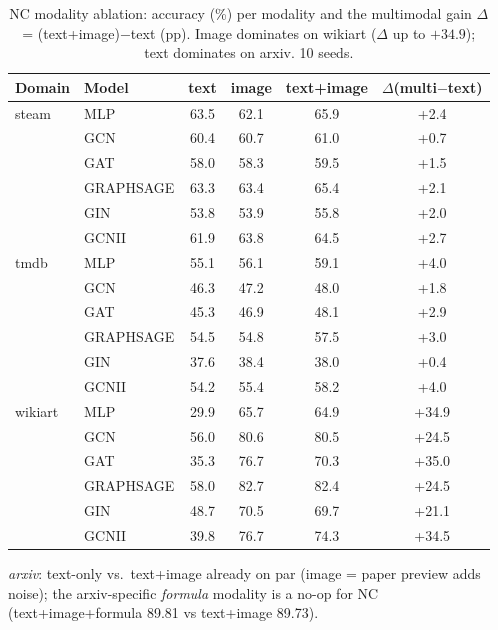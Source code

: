 \begin{table}[ht]
\centering\small\setlength{\tabcolsep}{6pt}\renewcommand{\arraystretch}{1.1}
\caption{NC modality ablation: accuracy (\%) per modality and the multimodal gain $\Delta$ = (text+image)$-$text (pp). Image dominates on wikiart ($\Delta$ up to $+34.9$); text dominates on arxiv. 10 seeds.}
\label{tab:nc_modality}
\begin{tabular}{llcccc}
\toprule
Domain & Model & text & image & text+image & $\Delta$(multi$-$text) \\
\midrule
steam    & MLP        & 63.5 & 62.1 & 65.9 & +2.4 \\
         & GCN        & 60.4 & 60.7 & 61.0 & +0.7 \\
         & GAT        & 58.0 & 58.3 & 59.5 & +1.5 \\
         & GRAPHSAGE  & 63.3 & 63.4 & 65.4 & +2.1 \\
         & GIN        & 53.8 & 53.9 & 55.8 & +2.0 \\
         & GCNII      & 61.9 & 63.8 & 64.5 & +2.7 \\
\midrule
tmdb     & MLP        & 55.1 & 56.1 & 59.1 & +4.0 \\
         & GCN        & 46.3 & 47.2 & 48.0 & +1.8 \\
         & GAT        & 45.3 & 46.9 & 48.1 & +2.9 \\
         & GRAPHSAGE  & 54.5 & 54.8 & 57.5 & +3.0 \\
         & GIN        & 37.6 & 38.4 & 38.0 & +0.4 \\
         & GCNII      & 54.2 & 55.4 & 58.2 & +4.0 \\
\midrule
wikiart  & MLP        & 29.9 & 65.7 & 64.9 & +34.9 \\
         & GCN        & 56.0 & 80.6 & 80.5 & +24.5 \\
         & GAT        & 35.3 & 76.7 & 70.3 & +35.0 \\
         & GRAPHSAGE  & 58.0 & 82.7 & 82.4 & +24.5 \\
         & GIN        & 48.7 & 70.5 & 69.7 & +21.1 \\
         & GCNII      & 39.8 & 76.7 & 74.3 & +34.5 \\
\bottomrule
\end{tabular}
\par\smallskip\footnotesize\emph{arxiv}: text-only vs.\ text+image already on par (image = paper preview adds noise); the arxiv-specific \emph{formula} modality is a no-op for NC (text+image+formula 89.81 vs text+image 89.73).
\end{table}
